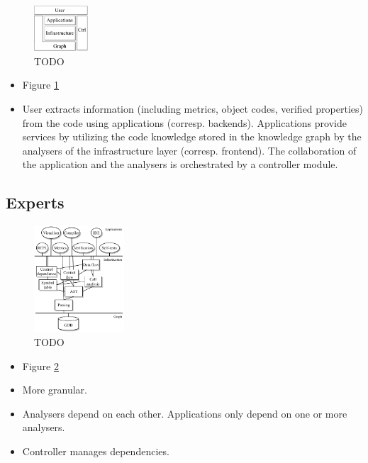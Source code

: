 \documentclass[sigconf]{acmart}
\begin{document}
  \begin{figure}
    \includegraphics[width=0.18\textwidth]{figures/arch-top.pdf}
    \caption{TODO}\label{fig:arch-top}
  \end{figure}

  \begin{itemize}
    \item Figure \ref{fig:arch-top} 
    \item User extracts information (including metrics, object codes, verified properties) from the code using applications (corresp. backends). Applications provide services by utilizing the code knowledge stored in the knowledge graph by the analysers of the infrastructure layer (corresp. frontend). The collaboration of the application and the analysers is orchestrated by a controller module.
  \end{itemize}
	
	\subsection{Experts} %

  \begin{figure}
    \includegraphics[width=0.3\textwidth]{figures/arch-deps.pdf}
    \caption{TODO}\label{fig:arch-deps}
  \end{figure}

  \begin{itemize}
    \item Figure \ref{fig:arch-deps} 
    \item More granular.
    \item Analysers depend on each other. Applications only depend on one or more analysers.
    \item Controller manages dependencies.
  \end{itemize}
	
\end{document}
